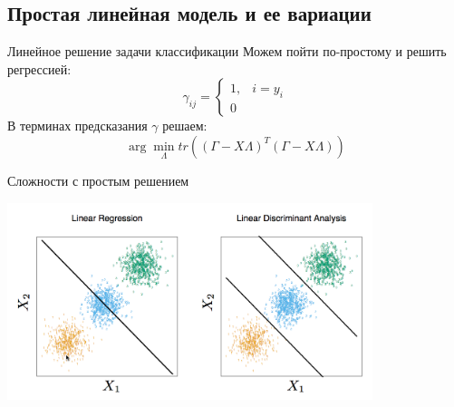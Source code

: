 \documentclass[14pt, fleqn, xcolor={dvipsnames, table}]{beamer}
\begin{document}
\subsection{Простая линейная модель и ее вариации}
\begin{frame}{Линейное решение задачи классификации}
Можем пойти по-простому и решить регрессией:
$$
\gamma_{ij} = \left\{\begin{array}{ll}
1,& i = y_i \\
0 
\end{array}\right.
$$
В терминах предсказания $\gamma$ решаем:
$$
\arg \min_\Lambda tr\left((\Gamma - X\Lambda)^T(\Gamma - X\Lambda)\right)
$$
\end{frame}

\begin{frame}{Сложности с простым решением}\small
\begin{center}
\includegraphics[width=0.8\textwidth]{4_2.png}
\end{center}
\end{frame}
\end{document}
